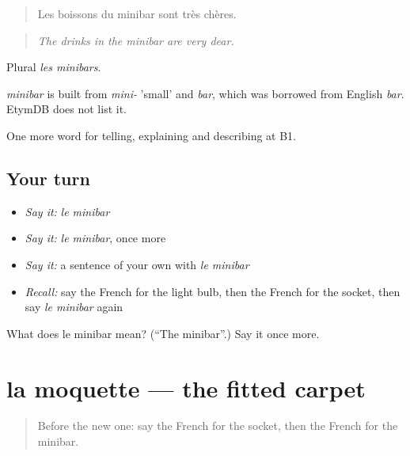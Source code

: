 \begin{quote}
Les boissons du minibar sont très chères.
\end{quote}

\begin{quote}
\emph{The drinks in the minibar are very dear.}
\end{quote}

Plural \emph{les minibars}.

\begin{cousinweb}
\emph{minibar} is built from \emph{mini-} 'small' and \emph{bar}, which was borrowed from English \emph{bar}. EtymDB does not list it.
\end{cousinweb}

\begin{grammarlens}[title={What you've built}]
One more word for telling, explaining and describing at B1.
\end{grammarlens}

\subsection*{Your turn}
\begin{itemize}
\raggedright
  \item \emph{Say it:} \emph{le minibar}
  \item \emph{Say it:} \emph{le minibar}, once more
  \item \emph{Say it:} a sentence of your own with \emph{le minibar}
  \item \emph{Recall:} say the French for the light bulb, then the French for the socket, then say \emph{le minibar} again
\end{itemize}

\begin{tcolorbox}[breakable,colback=teal!4,colframe=teal!35!black,title={Before you move on}]
What does le minibar mean? (\textquotedblleft{}The minibar\textquotedblright{}.) Say it once more.
\end{tcolorbox}
\section[la moquette]{la moquette — the fitted carpet}

\label{lesson:FR-C429-moquette}



\begin{quote}
Before the new one: say the French for the socket, then the French for the minibar.
\end{quote}

